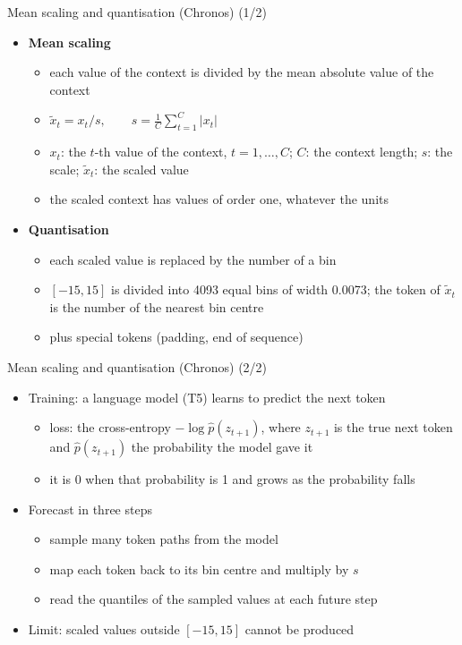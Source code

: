\begin{frame}{Mean scaling and quantisation (Chronos) (1/2)}
\itemsize{\footnotesize}
\begin{itemize}
    \item \textbf{Mean scaling}
    \begin{itemize}
        \item each value of the context is divided by the mean absolute value of the context
        \item $\tilde x_t = x_t / s, \qquad s = \frac{1}{C}\sum_{t=1}^{C} |x_t|$
        \item $x_t$: the $t$-th value of the context, $t = 1, \dots, C$; $C$: the context length; $s$: the scale; $\tilde x_t$: the scaled value
        \item the scaled context has values of order one, whatever the units
    \end{itemize}
    \item \textbf{Quantisation}
    \begin{itemize}
        \item each scaled value is replaced by the number of a bin
        \item $[-15, 15]$ is divided into 4093 equal bins of width 0.0073; the token of $\tilde x_t$ is the number of the nearest bin centre
        \item plus special tokens (padding, end of sequence)
    \end{itemize}
\end{itemize}
\end{frame}

\begin{frame}{Mean scaling and quantisation (Chronos) (2/2)}
\itemsize{\small}
\begin{itemize}
    \item Training: a language model (T5) learns to predict the next token
    \begin{itemize}
        \item loss: the cross-entropy $-\log \hat p(z_{t+1})$, where $z_{t+1}$ is the true next token and $\hat p(z_{t+1})$ the probability the model gave it
        \item it is 0 when that probability is 1 and grows as the probability falls
    \end{itemize}
    \item Forecast in three steps
    \begin{itemize}
        \item sample many token paths from the model
        \item map each token back to its bin centre and multiply by $s$
        \item read the quantiles of the sampled values at each future step
    \end{itemize}
    \item Limit: scaled values outside $[-15, 15]$ cannot be produced
\end{itemize}
\end{frame}

